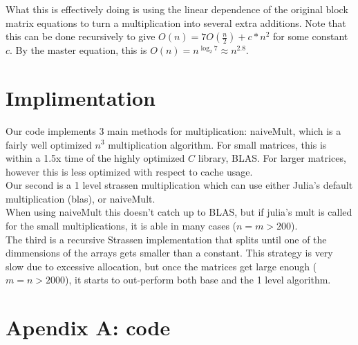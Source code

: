 \documentclass{article}         %
\begin{document}
What this is effectively doing is using the linear dependence of the original block matrix equations to turn a multiplication into several extra additions. Note that this can be done recursively to give $O(n)=7O(\frac{n}{2})+c*n^2$ for some constant $c$. By the master equation, this is $O(n)=n^{\log_2{7}}\approx n^{2.8}$.


\section*{Implimentation}
Our code implements 3 main methods for multiplication: naiveMult, which is a fairly well optimized $n^{3}$ multiplication
algorithm. For small matrices, this is within a 1.5x time of the highly optimized $C$ library, BLAS. For larger matrices, however this is less optimized with respect to cache usage.\\
Our second is a 1 level strassen multiplication which can use either Julia's default multiplication (blas), or naiveMult.\\
When using naiveMult this doesn't catch up to BLAS, but if julia's mult is called for the small multiplications, it is able
in many cases ($n=m>200$).\\
The third is a recursive Strassen implementation that splits until one of the dimmensions of the arrays gets smaller than a constant.
This strategy is very slow due to excessive allocation, but once the matrices get large enough ($m=n>2000$), it starts to out-perform both
base and the 1 level algorithm.\\

\section*{Apendix A: code}

\end{document}
